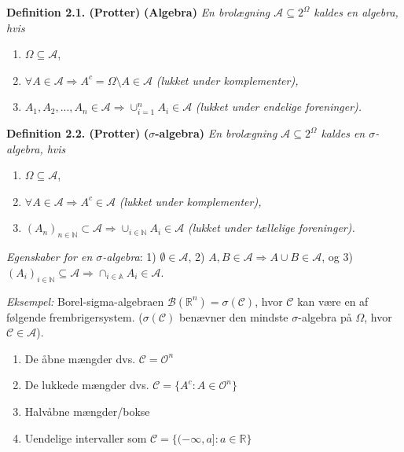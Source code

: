 \documentclass[a4paper,12pt,openany]{book}
\providecommand{\tightlist}{%
 \setlength{\itemsep}{0pt}\setlength{\parskip}{0pt}}
\begin{document}
\textbf{Definition 2.1. (Protter)} \textbf{(Algebra)} \emph{En brolægning \(\mathcal{A}\subseteq 2^\Omega\) kaldes en algebra, hvis}

\begin{enumerate}
\def\labelenumi{\arabic{enumi}.}
\tightlist
\item
  \(\Omega\subseteq\mathcal{A}\),
\item
  \(\forall A\in\mathcal{A} \Rightarrow A^c=\Omega\setminus A\in\mathcal{A}\) \emph{(lukket under komplementer),}
\item
  \(A_1,A_2,...,A_n\in\mathcal{A}\Rightarrow \cup_{i=1}^n A_i\in\mathcal{A}\) \emph{(lukket under endelige foreninger).}
\end{enumerate}

\textbf{Definition 2.2. (Protter)} \textbf{(\(\mathit{\sigma}\)-algebra)} \emph{En brolægning \(\mathcal{A}\subseteq 2^\Omega\) kaldes en \(\sigma\)-algebra, hvis}

\begin{enumerate}
\def\labelenumi{\arabic{enumi}.}
\tightlist
\item
  \(\Omega\subseteq\mathcal{A}\),
\item
  \(\forall A\in\mathcal{A} \Rightarrow A^c\in\mathcal{A}\) \emph{(lukket under komplementer),}
\item
  \((A_n)_{n\in\mathbb{N}}\subset\mathcal{A}\Rightarrow \cup_{i\in\mathbb{N}} A_i\in\mathcal{A}\) \emph{(lukket under tællelige foreninger).}
\end{enumerate}

\emph{Egenskaber for en \(\sigma\)-algebra}: 1) \(\emptyset\in\mathcal{A}\), 2) \(A,B\in\mathcal{A}\Rightarrow A \cup B\in\mathcal{A}\), og 3) \((A_i)_{i\in\mathbb{N}}\subseteq\mathcal{A}\Rightarrow\cap_{i\in\mathbb{A}}A_i\in\mathcal{A}\).

\emph{Eksempel:} Borel-sigma-algebraen \(\mathcal{B}(\mathbb{R}^n)=\sigma(\mathcal{C})\), hvor \(\mathcal{C}\) kan være en af følgende frembrigersystem. (\(\sigma(\mathcal{C})\) benævner den mindste \(\sigma\)-algebra på \(\Omega\), hvor \(\mathcal{C}\in\mathcal{A}\)).

\begin{enumerate}
\def\labelenumi{\roman{enumi}.}
\tightlist
\item
  De åbne mængder dvs. \(\mathcal{C}=\mathcal{O}^n\)
\item
  De lukkede mængder dvs. \(\mathcal{C}=\{A^c : A\in\mathcal{O}^n\}\)
\item
  Halvåbne mængder/bokse
\item
  Uendelige intervaller som \(\mathcal{C}=\{(-\infty,a] : a\in\mathbb{R}\}\)
\end{enumerate}
\end{document}
